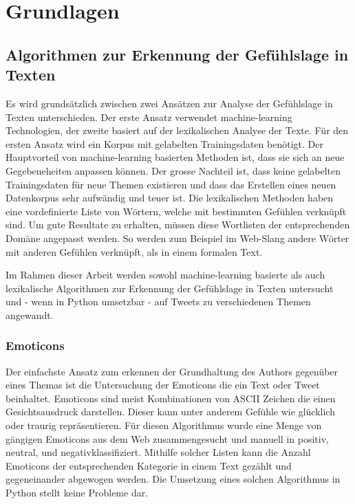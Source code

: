 \clearpage
\section{Grundlagen}
\subsection{Algorithmen zur Erkennung der Gefühlslage in Texten}
Es wird grundsätzlich zwischen zwei Ansätzen zur Analyse der Gefühlslage in Texten unterschieden. Der erste Ansatz verwendet machine-learning Technologien, der zweite basiert auf der lexikalischen Analyse der Texte. Für den ersten Ansatz wird ein Korpus mit gelabelten Trainingsdaten benötigt. \cite{thumbs_up} Der Hauptvorteil von machine-learning basierten Methoden ist, dass sie sich an neue Gegebeneheiten anpassen können. Der grosse Nachteil ist, dass keine gelabelten Trainingsdaten für neue Themen existieren und dass das Erstellen eines neuen Datenkorpus sehr aufwändig und teuer ist. Die lexikalischen Methoden haben eine vordefinierte Liste von Wörtern, welche mit bestimmten Gefühlen verknüpft sind. Um gute Resultate zu erhalten, müssen diese Wortlisten der entsprechenden Domäne angepasst werden. So werden zum Beispiel im Web-Slang andere Wörter mit anderen Gefühlen verknüpft, als in einem formalen Text. \cite{comparing}

Im Rahmen dieser Arbeit werden sowohl machine-learning basierte als auch lexikalische Algorithmen zur Erkennung der Gefühlslage in Texten untersucht und - wenn in Python umsetzbar - auf Tweets zu verschiedenen Themen angewandt.

\subsubsection{Emoticons}
Der einfachste Ansatz zum erkennen der Grundhaltung des Authors gegenüber eines Themas ist die Untersuchung der Emoticons die ein Text oder Tweet beinhaltet. Emoticons sind meist Kombinationen von ASCII Zeichen die einen Gesichtsausdruck darstellen. Dieser kann unter anderem Gefühle wie glücklich oder traurig repräsentieren. Für diesen Algorithmus wurde eine Menge von gängigen Emoticons aus dem Web \cite{emoticons1}\cite{emoticons2}\cite{emoticons3}\cite{emoticons4} zusammengesucht und manuell in \flqq positiv\frqq, \flqq neutral\frqq, und \flqq negativ\frqq klassifiziert. Mithilfe solcher Listen kann die Anzahl Emoticons der entsprechenden Kategorie in einem Text gezählt und gegeneinander abgewogen werden. \cite{comparing} Die Umsetzung eines solchen Algorithmus in Python stellt keine Probleme dar.

